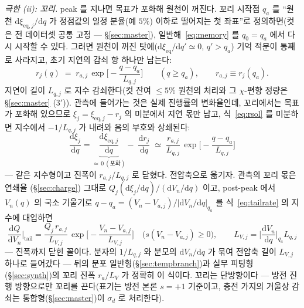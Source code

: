 \documentclass[11pt,a4paper]{article}
\newcommand{\dd}{\mathrm{d}}
\newcommand{\eq}{\mathrm{eq}}
\begin{document}
\emph{극한 (ii): 꼬리.} peak 를 지나면 목표가 포화해 원천이 꺼진다. 꼬리 시작점 $q_a$ 를 ``원천
$\dd\xi_{\eq,j}/\dd q$ 가 정점값의 일정 분율(예 $5\%$) 이하로 떨어지는 첫 좌표''로 정의하면(컷은 전
데이터셋 공통 고정 — \S\ref{sec:master}), 일반해~\eqref{eq:memory} 를 $q_0=q_a$ 에서 다시
시작할 수 있다. 그러면 원천이 꺼진 탓에($\dd\xi_{\eq}/\dd q'\simeq0$, $q'>q_a$) 기억 적분이
통째로 사라지고, 초기 지연의 감쇠 항 하나만 남는다:
\begin{equation}
r_j(q)\;=\;r_{a,j}\,\exp\!\Big[-\frac{q-q_a}{L_{q,j}}\Big]\qquad(q\ge q_a),\qquad
r_{a,j}\equiv r_j(q_a).
\label{eq:rsol}
\end{equation}
지연이 길이 $L_{q,j}$ 로 지수 감쇠한다(컷 잔여 $\le5\%$ 원천의 처리와 그 $\chi$-편향 정량은
\S\ref{sec:master} (3$'$)). 관측에 들어가는 것은 실제 진행률의 변화율인데, 꼬리에서는
목표가 포화해 있으므로 $\xi_j=\xi_{\eq,j}-r_j$ 의 미분에서 지연 몫만 남고, 식~\eqref{eq:rsol} 를
미분하면 지수에서 $-1/L_{q,j}$ 가 내려와 음의 부호와 상쇄된다:
\begin{equation}
\frac{\dd\xi_j}{\dd q}
=\underbrace{\frac{\dd\xi_{\eq,j}}{\dd q}}_{\simeq\,0\ (\text{포화})}-\;\frac{\dd r_j}{\dd q}
\;\simeq\;\frac{r_{a,j}}{L_{q,j}}\,\exp\!\Big[-\frac{q-q_a}{L_{q,j}}\Big]
\label{eq:tailrate}
\end{equation}
— 같은 지수형이고 진폭이 $r_{a,j}/L_{q,j}$ 로 닫혔다. 전압축으로 옮기자. 관측의 꼬리 몫은 연쇄율
(\S\ref{sec:charge}) 그대로 $Q_j(\dd\xi_j/\dd q)/(\dd V_n/\dd q)$ 이고, post-peak 에서
$V_n(q)$ 의 국소 기울기로 $q-q_a=(V_n-V_{a,j})/|\dd V_n/\dd q|_{q_a}$ 를 식~\eqref{eq:tailrate}
의 지수에 대입하면
\begin{equation}
\frac{\dd Q}{\dd V_n}\Big|_{\text{tail}}
=\frac{Q_j\,r_{a,j}}{L_{V,j}}\,
\exp\!\Big[-\frac{V_n-V_{a,j}}{L_{V,j}}\Big]\quad\big(s(V_n-V_{a,j})\ge0\big),\qquad
L_{V,j}=\Big|\frac{\dd V_n}{\dd q}\Big|_{q_a}L_{q,j}
\label{eq:tail}
\end{equation}
— 진폭까지 닫힌 꼴이다. 분자의 $1/L_{q,j}$ 와 분모의 $\dd V_n/\dd q$ 가 묶여 전압축 길이
$L_{V,j}$ 하나로 들어갔다 — 뒤의 분포 일반형(\S\ref{sec:tempbranch})과 실무 피팅형
(\S\ref{sec:synth})의 꼬리 진폭 $r_a/L_V$ 가 정확히 이 식이다.
꼬리는 단방향이다 — 방전 진행 방향으로만 꼬리를 끈다(표기는 방전 본론 $s=+1$ 기준이고, 충전
가지의 거울상 감쇠는 통합형(\S\ref{sec:master})이 $\sigma_d$ 로 처리한다).
\end{document}
